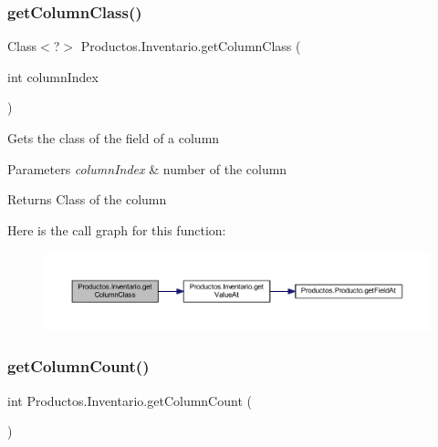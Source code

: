 \mbox{\label{class_productos_1_1_inventario_a7292cea9b1726ac1635a202f3528886e}} 
\subsubsection{\texorpdfstring{get\+Column\+Class()}{getColumnClass()}}
{\footnotesize\ttfamily Class$<$?$>$ Productos.\+Inventario.\+get\+Column\+Class (\begin{DoxyParamCaption}\item[{int}]{column\+Index }\end{DoxyParamCaption})}

Gets the class of the field of a column 
\begin{DoxyParams}{Parameters}
{\em column\+Index} & number of the column \\
\hline
\end{DoxyParams}
\begin{DoxyReturn}{Returns}
Class of the column 
\end{DoxyReturn}
Here is the call graph for this function\+:
\nopagebreak
\begin{figure}[H]
\begin{center}
\leavevmode
\includegraphics[width=350pt]{class_productos_1_1_inventario_a7292cea9b1726ac1635a202f3528886e_cgraph}
\end{center}
\end{figure}
\mbox{\label{class_productos_1_1_inventario_a0e88d355b4149cf548ae1cf27e5c342c}} 
\subsubsection{\texorpdfstring{get\+Column\+Count()}{getColumnCount()}}
{\footnotesize\ttfamily int Productos.\+Inventario.\+get\+Column\+Count (\begin{DoxyParamCaption}{ }\end{DoxyParamCaption})}

